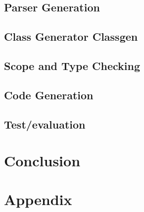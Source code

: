 	\section{Parser Generation}
	\section{Class Generator Classgen}
	\section{Scope and Type Checking}
	\section{Code Generation}

\renewcommand{\ind}[1]{}
\section{Test/evaluation}

\renewcommand{\ind}[1]{}
\chapter{Conclusion}



\begingroup
	\raggedright
	{}	%
\endgroup


\newpage
\listoffixmes	%

\clearforchapter
\chapter{Appendix}
\appendix	%


\renewcommand{\ind}[1]{}

